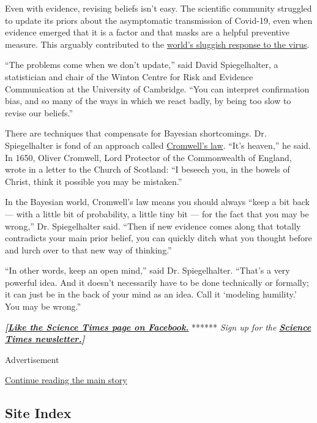 Even with evidence, revising beliefs isn't easy. The scientific
community struggled to update its priors about the asymptomatic
transmission of Covid-19, even when evidence emerged that it is a factor
and that masks are a helpful preventive measure. This arguably
contributed to the
\href{https://www.nytimes3xbfgragh.onion/2020/06/27/world/europe/coronavirus-spread-asymptomatic.html?action=click\&module=RelatedLinks\&pgtype=Article}{world's
sluggish response to the virus}.

``The problems come when we don't update,'' said David Spiegelhalter, a
statistician and chair of the Winton Centre for Risk and Evidence
Communication at the University of Cambridge. ``You can interpret
confirmation bias, and so many of the ways in which we react badly, by
being too slow to revise our beliefs.''

There are techniques that compensate for Bayesian shortcomings. Dr.
Spiegelhalter is fond of an approach called
\href{https://understandinguncertainty.org/node/97}{Cromwell's law}.
``It's heaven,'' he said. In 1650, Oliver Cromwell, Lord Protector of
the Commonwealth of England, wrote in a letter to the Church of
Scotland: ``I beseech you, in the bowels of Christ, think it possible
you may be mistaken.''

In the Bayesian world, Cromwell's law means you should always ``keep a
bit back --- with a little bit of probability, a little tiny bit --- for
the fact that you may be wrong,'' Dr. Spiegelhalter said. ``Then if new
evidence comes along that totally contradicts your main prior belief,
you can quickly ditch what you thought before and lurch over to that new
way of thinking.''

``In other words, keep an open mind,'' said Dr. Spiegelhalter. ``That's
a very powerful idea. And it doesn't necessarily have to be done
technically or formally; it can just be in the back of your mind as an
idea. Call it `modeling humility.' You may be wrong.''

\textbf{\emph{{[}}\href{http://on.fb.me/1paTQ1h}{\emph{Like the Science
Times page on Facebook.}}} ****** \emph{\textbar{} Sign up for the}
\textbf{\href{http://nyti.ms/1MbHaRU}{\emph{Science Times
newsletter.}}\emph{{]}}}

Advertisement

\protect\hyperlink{after-bottom}{Continue reading the main story}

\hypertarget{site-index}{%
\subsection{Site Index}\label{site-index}}

